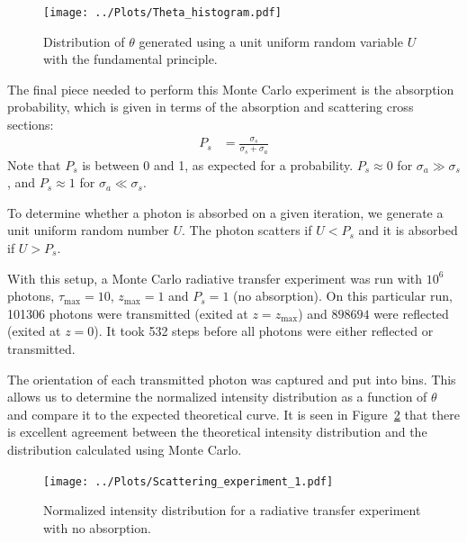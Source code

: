 \documentclass[twocolumn]{myarticle}
\begin{document}
\begin{figure}[ht!]
    \begin{center}
    \texttt{[image: ../Plots/Theta\_histogram.pdf]}
    \caption{%
        Distribution of $ \theta $ generated using a unit uniform random variable $ U $ with the fundamental principle.
    }
    \label{fig:theta_histogram}
    \end{center}
\end{figure}

The final piece needed to perform this Monte Carlo experiment is the absorption probability, which is given in terms of the absorption and scattering cross sections:
\begin{align}
    P_s &= \frac{\sigma_s}{\sigma_s + \sigma_a}
\end{align}
Note that $ P_s $ is between 0 and 1, as expected for a probability.
$ P_s \approx 0 $ for $ \sigma_a \gg \sigma_s $, and $ P_s \approx 1 $ for $ \sigma_a \ll \sigma_s $.

To determine whether a photon is absorbed on a given iteration, we generate a unit uniform random number $ U $. 
The photon scatters if $ U < P_s $ and it is absorbed if $ U > P_s $.

With this setup, a Monte Carlo radiative transfer experiment was run with $ 10^6 $ photons, $ \tau_\text{max} = 10 $, $ z_\text{max} = 1 $ and $ P_s = 1 $ (no absorption).
On this particular run, 101306 photons were transmitted (exited at $ z = z_\text{max} $) and $ 898694 $ were reflected (exited at $ z = 0 $).
It took 532 steps before all photons were either reflected or transmitted.

The orientation of each transmitted photon was captured and put into bins.
This allows us to determine the normalized intensity distribution as a function of $ \theta $ and compare it to the expected theoretical curve.
It is seen in Figure~\ref{fig:scattering_experiment_1} that there is excellent agreement between the theoretical intensity distribution and the distribution calculated using Monte Carlo.

\begin{figure}[ht!]
    \begin{center}
    \texttt{[image: ../Plots/Scattering\_experiment\_1.pdf]}
    \caption{%
        Normalized intensity distribution for a radiative transfer experiment with no absorption.
    }
    \label{fig:scattering_experiment_1}
    \end{center}
\end{figure}
\end{document}
